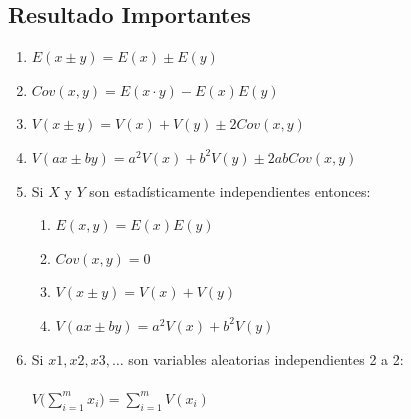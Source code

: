 \subsection{Resultado Importantes}
\begin{enumerate}
\item $E(x\pm y)=E(x)\pm E(y)$
\item $Cov(x,y)=E(x\cdot y) - E(x)E(y)$
\item $V(x\pm y)=V(x)+V(y)\pm 2Cov(x,y)$
\item $V(ax\pm by)=a^2 V(x)+b^2V(y)\pm 2abCov(x,y)$
\item Si $X$ y $Y$ son estadísticamente independientes entonces:
\begin{enumerate}
\item $E(x,y)=E(x)E(y)$
\item $Cov(x,y)=0$
\item $V(x\pm y)=V(x)+V(y)$
\item $V(ax\pm by)=a^2V(x)+b^2V(y)$

\end{enumerate}
\item Si $x1,x2,x3,\ldots$ son variables aleatorias independientes 2 a 2:\\ \vspace{0.025cm} \\
$V\Bigg( \displaystyle\sum_{i=1}^{m} x_i \Bigg) = \displaystyle\sum_{i=1}^{m} V(x_i)$
\end{enumerate}